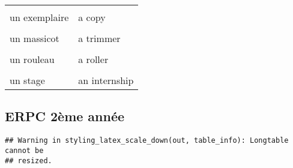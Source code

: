 \documentclass[
  10pt,
]{article}
\begin{document}
\begin{longtable}{ll}
\cellcolor{gray!6}{une surface, une tache} & \cellcolor{gray!6}{a spot}\\

un exemplaire & a copy\\

\cellcolor{gray!6}{un fichier numérique} & \cellcolor{gray!6}{a digital file}\\

un massicot & a trimmer\\

\cellcolor{gray!6}{un pli} & \cellcolor{gray!6}{a fold}\\

un rouleau & a roller\\

\cellcolor{gray!6}{un sondage} & \cellcolor{gray!6}{a poll}\\

un stage & an internship\\
\bottomrule
\end{longtable}

\hypertarget{erpc-2uxe8me-annuxe9e}{%
\subsection{ERPC 2ème année}\label{erpc-2uxe8me-annuxe9e}}

\begin{verbatim}
## Warning in styling_latex_scale_down(out, table_info): Longtable cannot be
## resized.
\end{verbatim}
\end{document}

